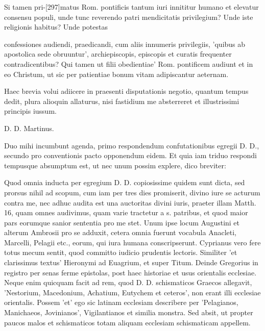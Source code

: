 Si tamen pri-[297]matus Rom. pontificis tantum iuri innititur humano et elevatur consensu populi, unde tunc reverendo patri mendicitatis privilegium? Unde iste religionis habitus? Unde potestas

confessiones audiendi, praedicandi, cum aliis innumeris privilegiis, 'quibus ab apostolica sede obruuntur', archiepiscopis, episcopis et curatis frequenter contradicentibus? Qui tamen ut filii obedientiae' Rom. pontificem audiunt et in eo Christum, ut sic per patientiae bonum vitam adipiscantur aeternam.

Haec brevia volui adiicere in praesenti disputationis negotio, quantum tempus dedit, plura alioquin allaturus, nisi fastidium me absterreret et illustrissimi principis iussum.

D. D. Martinus.

Duo mihi incumbunt agenda, primo respondendum confutationibus egregii D. D., secundo pro conventionis pacto opponendum eidem. Et quia iam triduo respondi tempusque absumptum est, ut nec unum possim explere, dico breviter:

Quod omnia inducta per egregium D. D. copiosissime quidem sunt dicta, sed prorsus nihil ad scopum, cum iam per tres dies promiserit, divino iure se acturum contra me, nec adhuc audita est una auctoritas divini iuris, praeter illam Matth. 16, quam omnes audivimus, quam varie tractetur a s. patribus, et quod maior pars eorumque sanior sententia pro me stet. Unum ipse locum Augustini et alterum Ambrosii pro se adduxit, cetera omnia fuerunt vocabula Anacleti, Marcelli, Pelagii etc., eorum, qui iura humana conscripserunt. Cyprianus vero fere totus mecum sentit, quod committo iudicio prudentis lectoris. Similiter 'et clarissimus textus' Hieronymi ad Euagrium, et super Titum. Deinde Gregorius in registro per senas ferme epistolas, post haec historiae et usus orientalis ecclesiae. Neque enim quicquam facit ad rem, quod D. D. schismaticos Graecos allegavit, 'Nestorium, Macedonium, Achatium, Eutychem et ceteros', non erant illi ecclesiae orientalis. Possem 'et' ego sic latinam ecclesiam describere per 'Pelagianos, Manichaeos, Jovinianos', Vigilantianos et similia monstra. Sed absit, ut propter paucos malos et schismaticos totam aliquam ecclesiam schismaticam appellem.

